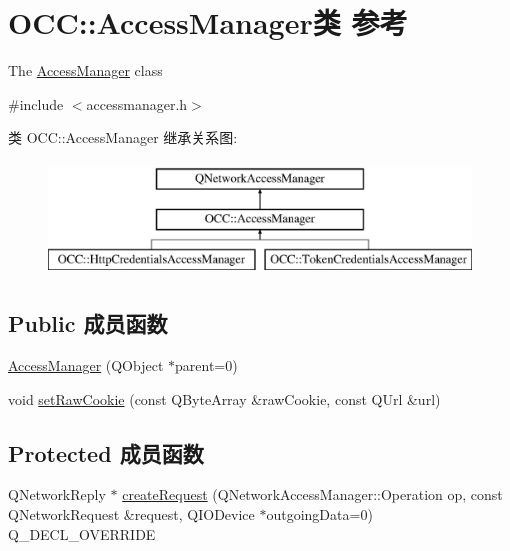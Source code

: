 \hypertarget{class_o_c_c_1_1_access_manager}{}\section{O\+CC\+:\+:Access\+Manager类 参考}
\label{class_o_c_c_1_1_access_manager}


The \hyperlink{class_o_c_c_1_1_access_manager}{Access\+Manager} class  




{\ttfamily \#include $<$accessmanager.\+h$>$}

类 O\+CC\+:\+:Access\+Manager 继承关系图\+:\begin{figure}[H]
\begin{center}
\leavevmode
\includegraphics[height=3.000000cm]{class_o_c_c_1_1_access_manager}
\end{center}
\end{figure}
\subsection*{Public 成员函数}
\begin{DoxyCompactItemize}
\item 
\hyperlink{class_o_c_c_1_1_access_manager_a96b34c140a6c327023f2fbb95e76aa6b}{Access\+Manager} (Q\+Object $\ast$parent=0)
\item 
void \hyperlink{class_o_c_c_1_1_access_manager_a7b05693bd72035bf9d3825d20fc74130}{set\+Raw\+Cookie} (const Q\+Byte\+Array \&raw\+Cookie, const Q\+Url \&url)
\end{DoxyCompactItemize}
\subsection*{Protected 成员函数}
\begin{DoxyCompactItemize}
\item 
Q\+Network\+Reply $\ast$ \hyperlink{class_o_c_c_1_1_access_manager_aed4b6d6996a748522bb9b55493df6d2a}{create\+Request} (Q\+Network\+Access\+Manager\+::\+Operation op, const Q\+Network\+Request \&request, Q\+I\+O\+Device $\ast$outgoing\+Data=0) Q\+\_\+\+D\+E\+C\+L\+\_\+\+O\+V\+E\+R\+R\+I\+DE
\end{DoxyCompactItemize}


